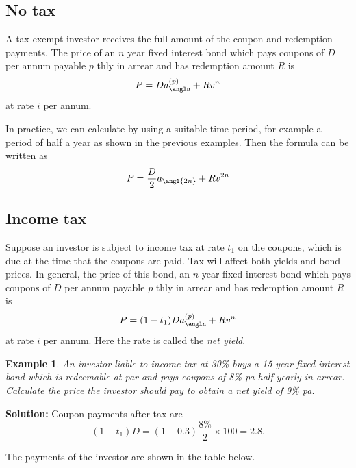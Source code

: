 \documentclass[
]{book}
\theoremstyle{definition}
\theoremstyle{definition}
\newtheorem{example}{Example}[chapter]
\theoremstyle{definition}
\theoremstyle{definition}
\theoremstyle{remark}
\begin{document}
\subsection{No tax}\label{no-tax}

A tax-exempt investor receives the full amount of the coupon and
redemption payments. The price of an \(n\) year fixed interest bond which
pays coupons of \(D\) per annum payable \(p\) thly in arrear and has
redemption amount \(R\) is \[P = D a_{\angln}^{(p)} + R v^n\] at rate \(i\)
per annum.

In practice, we can calculate by using a suitable time period, for
example a period of half a year as shown in the previous examples. Then
the formula can be written as
\[P = \frac{D}{2} a_{\angl{2n}} + R v^{2n}\]

\subsection{Income tax}\label{income-tax}

Suppose an investor is subject to income tax at rate \(t_1\) on the
coupons, which is due at the time that the coupons are paid. Tax will
affect both yields and bond prices. In general, the price of this bond,
an \(n\) year fixed interest bond which pays coupons of \(D\) per annum
payable \(p\) thly in arrear and has redemption amount \(R\) is
\[P = (1 - t_1) D a_{\angln}^{(p)} + R v^n\] at rate \(i\) per annum. Here
the rate is called the \emph{net yield}.

\begin{example}
\emph{An investor liable to income tax at 30\% buys a 15-year fixed interest
bond which is redeemable at par and pays coupons of 8\% pa half-yearly in
arrear. Calculate the price the investor should pay to obtain a net
yield of 9\% pa.}
\end{example}

\textbf{Solution:} Coupon payments after tax are
\[ (1 - t_1) D = (1 - 0.3) \frac{8\%}{2} \times 100 = 2.8.\]

The payments of the investor are shown in the table below.
\end{document}
